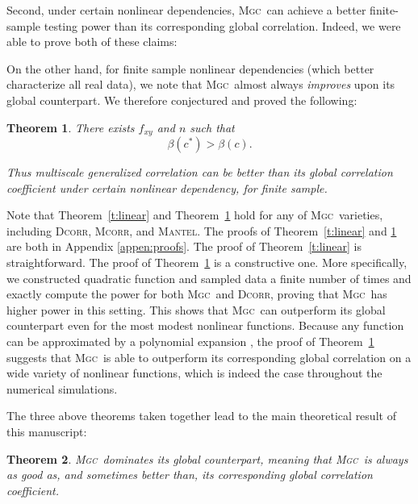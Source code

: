 \documentclass[11pt]{article}
\providecommand{\sct}[1]{{\normalfont\textsc{#1}}}
\newcommand{\G}{c}
\newcommand{\Mgc}{\sct{Mgc}}
\newcommand{\Dcorr}{\sct{Dcorr}}
\newcommand{\Mcorr}{\sct{Mcorr}}
\newcommand{\Mantel}{\sct{Mantel}}
\newtheorem{thm}{Theorem}
\begin{document}
Second, under certain nonlinear dependencies, \Mgc~can achieve a better finite-sample testing power than its corresponding global correlation. Indeed, we were able to prove both of these claims:


On the other hand, for finite sample nonlinear dependencies (which better characterize all real data), we note that \Mgc~almost always \emph{improves} upon its global counterpart.  We therefore conjectured and proved the following:
\begin{thm}
\label{t:non}
There exists $f_{xy}$ and $n$ such that
\begin{equation}
\beta(\G^{*}) > \beta(\G).
\end{equation}

Thus multiscale generalized correlation can be better than its global correlation coefficient under certain nonlinear dependency, for finite sample.
\end{thm}
Note that Theorem~\ref{t:linear} and Theorem~\ref{t:non} hold for any of \Mgc~varieties, including  \Dcorr, \Mcorr, and \Mantel.
%
The proofs of Theorem~\ref{t:linear} and \ref{t:non} are both in Appendix \ref{appen:proofs}.  The proof of Theorem~\ref{t:linear} is straightforward.  The proof of Theorem~\ref{t:non} is a constructive one. More specifically, we constructed quadratic function and sampled data a finite number of times and exactly compute the power for both \Mgc~and \Dcorr, proving that \Mgc~has higher power in this setting. This shows that \Mgc~can outperform its global counterpart even for the most modest nonlinear functions.  Because any function can be approximated by a polynomial expansion \cite{RudinBook}, the proof of Theorem~\ref{t:non} suggests that \Mgc~is able to outperform its corresponding global correlation on a wide variety of nonlinear functions, which is indeed the case throughout the numerical simulations. %

The three above theorems taken together lead to the main theoretical result of this manuscript:
\begin{thm}
\Mgc~dominates its global counterpart, meaning that \Mgc~is always as good as, and sometimes better than, its corresponding global correlation coefficient. 
\end{thm}


\end{document}
